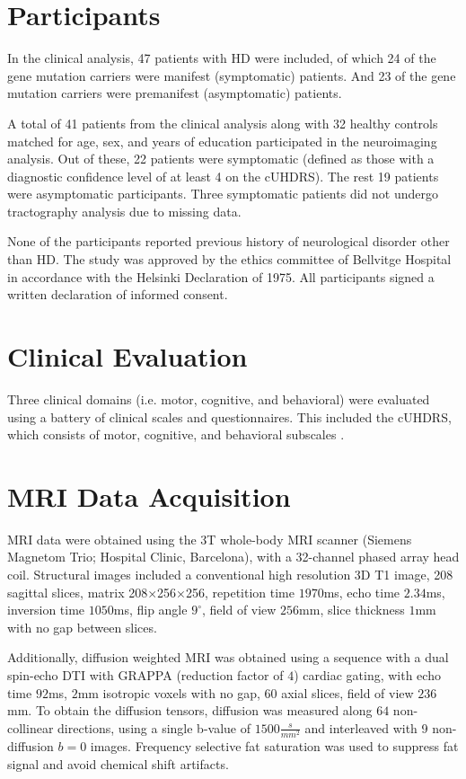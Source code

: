\label{sec:previous}

\section{Participants}

In the clinical analysis, 47 patients with \ac{HD} were included, of which 24 of the gene mutation carriers were manifest (symptomatic) patients. And 23 of the gene mutation carriers were premanifest (asymptomatic) patients.\par
A total of 41 patients from the clinical analysis along with 32 healthy controls matched for age, sex, and years of education participated in the neuroimaging analysis. Out of these, 22 patients were symptomatic (defined as those with a diagnostic confidence level of at least 4 on the \ac{cUHDRS}). The rest 19 patients were asymptomatic participants. Three symptomatic patients did not undergo tractography analysis due to missing data.\par
None of the participants reported previous history of neurological disorder other than \ac{HD}. The study was approved by the ethics committee of Bellvitge Hospital in accordance with the Helsinki Declaration of 1975. All participants signed a written declaration of informed consent.

\section{Clinical Evaluation}

Three clinical domains (i.e. motor, cognitive, and behavioral) were evaluated using a battery of clinical scales and questionnaires. This included the \ac{cUHDRS}, which consists of motor, cognitive, and behavioral subscales \cite{uhdrs}.

\section{MRI Data Acquisition}

\ac{MRI} data were obtained using the 3T whole-body MRI scanner (Siemens Magnetom Trio; Hospital Clinic, Barcelona), with a 32-channel phased array head coil. Structural images included a conventional high resolution 3D T1 image, 208 sagittal slices, matrix 208×256×256, repetition time $1970$ms, echo time $2.34$ms, inversion time $1050$ms, flip angle $9^{\circ}$, field of view $256$mm, slice thickness $1$mm with no gap between slices.\par
Additionally, diffusion weighted \ac{MRI} was obtained using a sequence with a dual spin-echo \ac{DTI} with GRAPPA (reduction factor of $4$) cardiac gating, with echo time $92$ms, $2$mm isotropic voxels with no gap, $60$ axial slices, field of view $236$mm. To obtain the diffusion tensors, diffusion was measured along $64$ non-collinear directions, using a single b-value of $1500\frac{s}{mm^2}$ and interleaved with 9 non-diffusion $b=0$ images. Frequency selective fat saturation was used to suppress fat signal and avoid chemical shift artifacts.

